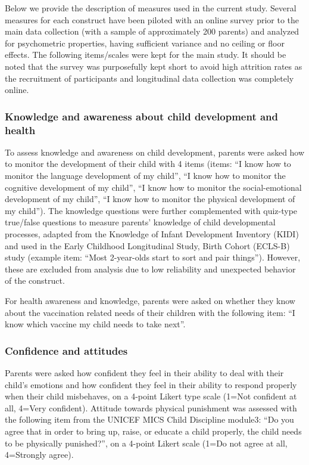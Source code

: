 \documentclass{article}
\begin{document}
Below we provide the description of measures used in the current study. Several measures for each construct have been piloted with an online survey prior to the main data collection (with a sample of approximately 200 parents) and analyzed for psychometric properties, having sufficient variance and no ceiling or floor effects. The following items/scales were kept for the main study. It should be noted that the survey was purposefully kept short to avoid high attrition rates as the recruitment of participants and longitudinal data collection was completely online.

\subsubsection*{Knowledge and awareness about child development and health}

To assess knowledge and awareness on child development, parents were asked how to monitor the development of their child with 4 items (items: “I know how to monitor the language development of my child”, “I know how to monitor the cognitive development of my child”, “I know how to monitor the social-emotional development of my child”, “I know how to monitor the physical development of my child”). The knowledge questions were further complemented with quiz-type true/false questions to measure parents’ knowledge of child developmental processes, adapted from the Knowledge of Infant Development Inventory (KIDI) and used in the Early Childhood Longitudinal Study, Birth Cohort (ECLS-B) study (example item: “Most 2-year-olds start to sort and pair things”).  However, these are excluded from analysis due to low reliability and unexpected behavior of the construct.

For health awareness and knowledge, parents were asked on whether they know about the vaccination related needs of their children with the following item: “I know which vaccine my child needs to take next”.

\subsubsection*{Confidence and attitudes}
Parents were asked how confident they feel in their ability to deal with their child’s emotions and how confident they feel in their ability to respond properly when their child misbehaves, on a 4-point Likert type scale (1=Not confident at all, 4=Very confident).
Attitude towards physical punishment was assessed with the following item from the UNICEF MICS Child Discipline module3: “Do you agree that in order to bring up, raise, or educate a child properly, the child needs to be physically punished?”, on a 4-point Likert scale (1=Do not agree at all, 4=Strongly agree).
\end{document}

